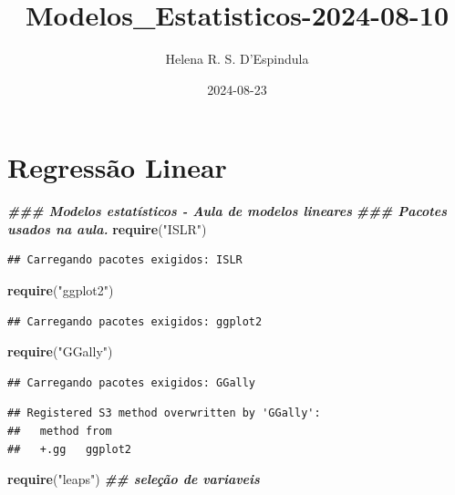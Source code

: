 \documentclass[
]{article}
\title{Modelos\_Estatisticos-2024-08-10}
\author{Helena R. S. D'Espindula}
\date{2024-08-23}
\newenvironment{Shaded}{\begin{snugshade}}{\end{snugshade}}
\newcommand{\DocumentationTok}[1]{\textcolor[rgb]{0.56,0.35,0.01}{\textbf{\textit{#1}}}}
\newcommand{\FunctionTok}[1]{\textcolor[rgb]{0.13,0.29,0.53}{\textbf{#1}}}
\newcommand{\NormalTok}[1]{#1}
\newcommand{\StringTok}[1]{\textcolor[rgb]{0.31,0.60,0.02}{#1}}
\begin{document}
\maketitle

{
\setcounter{tocdepth}{2}
\tableofcontents
}
\section{Regressão Linear}\label{regressuxe3o-linear}

\begin{Shaded}
\begin{Highlighting}[]
\DocumentationTok{\#\#\# Modelos estatísticos {-} Aula de modelos lineares}
\DocumentationTok{\#\#\# Pacotes usados na aula.}
\FunctionTok{require}\NormalTok{(}\StringTok{"ISLR"}\NormalTok{)}
\end{Highlighting}
\end{Shaded}

\begin{verbatim}
## Carregando pacotes exigidos: ISLR
\end{verbatim}

\begin{Shaded}
\begin{Highlighting}[]
\FunctionTok{require}\NormalTok{(}\StringTok{"ggplot2"}\NormalTok{)}
\end{Highlighting}
\end{Shaded}

\begin{verbatim}
## Carregando pacotes exigidos: ggplot2
\end{verbatim}

\begin{Shaded}
\begin{Highlighting}[]
\FunctionTok{require}\NormalTok{(}\StringTok{"GGally"}\NormalTok{)}
\end{Highlighting}
\end{Shaded}

\begin{verbatim}
## Carregando pacotes exigidos: GGally
\end{verbatim}

\begin{verbatim}
## Registered S3 method overwritten by 'GGally':
##   method from   
##   +.gg   ggplot2
\end{verbatim}

\begin{Shaded}
\begin{Highlighting}[]
\FunctionTok{require}\NormalTok{(}\StringTok{"leaps"}\NormalTok{) }\DocumentationTok{\#\# seleção de variaveis}
\end{Highlighting}
\end{Shaded}
\end{document}
